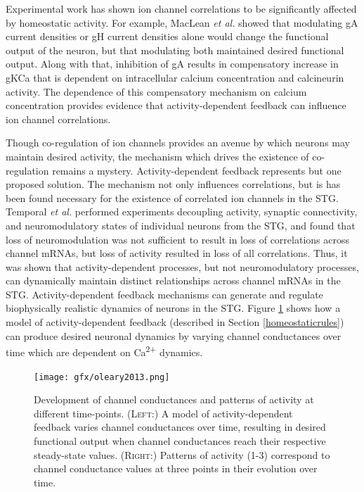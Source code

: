 Experimental work has shown ion channel correlations to be significantly affected by homeostatic activity\cite{taylor_axonal_2009,tran_ionic_2019,baumgardt_specification_2007,stein_modulation_2009,soofi_co-variation_2012,temporal_neuromodulation_2011}.
For example, MacLean \textit{et al.} showed that modulating \ac{gA} current densities or \ac{gH} current densities alone would change the functional output of the neuron, but that modulating both maintained desired functional output\cite{maclean_activity-independent_2005}.
Along with that, inhibition of \ac{gA} results in compensatory increase in \ac{gKCa} that is dependent on intracellular calcium concentration and calcineurin activity\cite{ransdell_rapid_2012}.
The dependence of this compensatory mechanism on calcium concentration provides evidence that activity-dependent feedback can influence ion channel correlations\cite{turrigiano_activity-dependent_1994,turrigiano_selective_1995}.

Though co-regulation of ion channels provides an avenue by which neurons may maintain desired activity, the mechanism which drives the existence of co-regulation remains a mystery.
Activity-dependent feedback represents but one proposed solution. The mechanism not only influences correlations, but is has been found necessary for the existence of correlated ion channels in the \ac{STG}.
Temporal \textit{et al.} performed experiments decoupling activity, synaptic connectivity, and neuromodulatory states of individual neurons from the \ac{STG}, and found that loss of neuromodulation was not sufficient to result in loss of correlations across channel mRNAs, but loss of activity resulted in loss of all correlations. Thus, it was shown that activity-dependent processes, but not neuromodulatory processes, can dynamically maintain distinct relationships across channel mRNAs in the \ac{STG}\cite{temporal_activity-dependent_2014}.
Activity-dependent feedback mechanisms can generate and regulate biophysically realistic dynamics of neurons in the \ac{STG}\cite{oleary_correlations_2013,oleary_cell_2014,liu_model_1998,lemasson_activity-dependent_1993}.
Figure \ref{fig:oleary2013} shows how a model of activity-dependent feedback (described in Section \ref{homeostaticrules}) can produce desired neuronal dynamics by varying channel conductances over time which are dependent on Ca\textsuperscript{2+} dynamics\cite{oleary_correlations_2013}.

\begin{figure}[H]
    \centering
    \texttt{[image: gfx/oleary2013.png]}
\caption[Model of activity-dependent feedback.]{Development of channel conductances and patterns of activity at different time-points. (\textsc{Left:}) A model of activity-dependent feedback varies channel conductances over time, resulting in desired functional output when channel conductances reach their respective steady-state values. (\textsc{Right:}) Patterns of activity (1-3) correspond to channel conductance values at three points in their evolution over time\cite{oleary_correlations_2013}.}
    \label{fig:oleary2013}
\end{figure}

